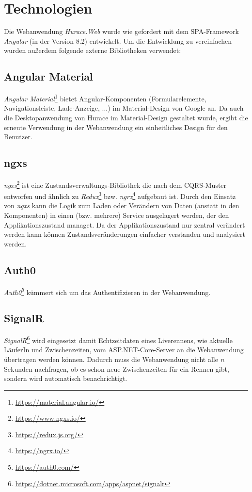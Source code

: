 \chapter{Technologien}
Die Webanwendung \emph{Hurace.Web} wurde wie gefordert mit dem SPA-Framework \emph{Angular} (in der Version 8.2) entwickelt.
Um die Entwicklung zu vereinfachen wurden außerdem folgende externe Bibliotheken verwendet:

\section{Angular Material}
\emph{Angular Material}\footnote{\url{https://material.angular.io/}} bietet Angular-Komponenten (\zB Formularelemente, Navigationsleiste, Lade-Anzeige, ...) im Material-Design von Google an.
Da auch die Desktopanwendung von Hurace im Material-Design gestaltet wurde, ergibt die erneute Verwendung in der Webanwendung ein einheitliches Design für den Benutzer.

\section{ngxs}
\emph{ngxs}\footnote{\url{https://www.ngxs.io/}} ist eine Zustandsverwaltungs-Bibliothek die nach dem CQRS-Muster entworfen und ähnlich zu \emph{Redux}\footnote{\url{https://redux.js.org/}} bzw. \emph{ngrx}\footnote{\url{https://ngrx.io/}} aufgebaut ist.
Durch den Einsatz von \emph{ngxs} kann die Logik zum Laden oder Verändern von Daten (anstatt in den Komponenten) in einen (bzw. mehrere) Service ausgelagert werden, der den Applikationszustand managet.
Da der Applikationszustand nur zentral verändert werden kann können Zustandsveränderungen einfacher verstanden und analysiert werden.

\section{Auth0}
\emph{Auth0}\footnote{\url{https://auth0.com/}} kümmert sich um das Authentifizieren in der Webanwendung.

\section{SignalR}
\emph{SignalR}\footnote{\url{https://dotnet.microsoft.com/apps/aspnet/signalr}} wird eingesetzt damit Echtzeitdaten eines Liverennens, wie aktuelle LäuferIn und Zwischenzeiten, vom ASP.NET-Core-Server an die Webanwendung übertragen werden können.
Dadurch muss die Webanwendung nicht alle \emph{n} Sekunden nachfragen, ob es schon neue Zwischenzeiten für ein Rennen gibt, sondern wird automatisch benachrichtigt.
